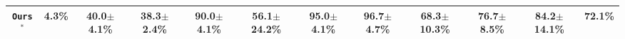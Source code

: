 \begin{table}[H]
\begin{adjustbox}{max width=\textwidth}
\begin{tabular}{cccccc|cccccc}
  \rowcolor{hclbrown!15!white}
  \texttt{Ours}$^{*}$
  & \textbf{4.3\%}
  & 40.0$\pm$4.1\%
  & 38.3$\pm$2.4\%
  & \textbf{90.0$\pm$4.1\%}
  & 56.1$\pm$24.2\%
  & \textbf{95.0$\pm$4.1\%}
  & \textbf{96.7$\pm$4.7\%}
  & 68.3$\pm$10.3\%
  & \textbf{76.7$\pm$8.5\%}
  & \textbf{84.2$\pm$14.1\%}
  & \textbf{72.1\%} \\

  \bottomrule
  \end{tabular}
  \end{adjustbox}
\end{table}
